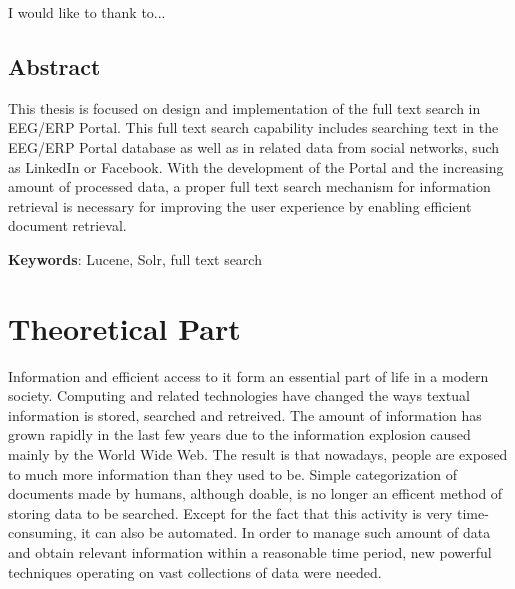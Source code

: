 \documentclass[12pt, oneside, a4paper]{book}
\begin{document}
I would like to thank to...

\pagebreak{}


\thispagestyle{empty}


\chapter*{Abstract}


This thesis is focused on design and implementation of the full text
search in EEG/ERP Portal. This full text search capability includes
searching text in the EEG/ERP Portal database as well as in related
data from social networks, such as LinkedIn or Facebook. With the
development of the Portal and the increasing amount of processed data,
a proper full text search mechanism for information retrieval is necessary
for improving the user experience by enabling efficient do\-cu\-ment retrieval. 

\pagebreak{}

{\bf Keywords}:
Lucene, Solr, full text search

\thispagestyle{empty}

\vfill\eject

\tableofcontents

\mainmatter





\part{Theoretical Part}

Information and efficient access to it form an essential part of life in a modern society. 
Computing and related technologies have changed the ways textual information is stored, searched and retreived. 
The amount of information has grown rapidly in the last few years due to the information explosion caused mainly by the World Wide Web. 
The result is that nowadays, people are exposed to much more information than they used to be. 
Simple categorization of documents made by humans, although doable, is no longer an efficent method of storing data to be searched. 
Except for the fact that this activity is very time-consuming, it can also be automated. 
In order to manage such amount of data and obtain relevant information within a reasonable time period, new powerful techniques operating on vast collections of data were needed.
\end{document}
